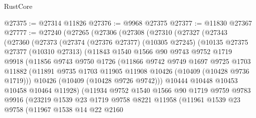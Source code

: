 \begin{lexlean}{RustCore}
\begin{coremodule}
@27375 := @27314 @11826
@27376 := @9968 @27375
@27377 := @11830 @27367
@27777 := @27240
    (@27265
      (@27306
        (@27308
          (@27310
            (@27327
              (@27343
                (@27360
                  (@27373
                    (@27374
                      (@27376 @27377)
                      (@10305 @27245)
                      (@10135
                        @27375
                        @27377
                        (@10310 @27313)
                        (@11843
                          @1540
                          @1566
                          @90
                          @9743
                          @9752
                          @1719
                          @9918
                          (@11856
                            @9743
                            @9750
                            @1726
                            (@11866
                              @9742
                              @9749
                              @1697
                              @9725
                              @1703
                              @11882
                              (@11891
                                @9735
                                @1703
                                @11905
                                @11908
                                @10426
                                (@10409 (@10428 @9736 @1719)))
                              @10426
                              (@10409 (@10428 @9726 @9742)))
                            @10444
                            @10448
                            @10453
                            @10458
                            @10464
                            @11928)
                          (@11934
                            @9752
                            @1540
                            @1566
                            @90
                            @1719
                            @9759
                            @9783
                            @9916
                            (@23219
                              @1539
                              @23
                              @1719
                              @9758
                              @8221
                              @11958
                              (@11961
                                @1539
                                @23
                                @9758
                                (@11967
                                  @1538
                                  @14
                                  @22
                                  @2160

\end{coremodule}
\end{lexlean}

